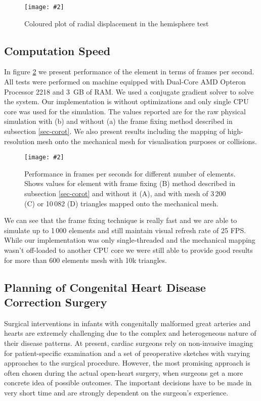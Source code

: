 \documentclass{egpubl}
\newcommand{\Figure}[3]{%
\begin{figure}[htb]
  \centering
  \texttt{[image: \#2]}
  \caption{\label{fig-#2}#3}
\end{figure}}
\begin{document}
\Figure{\linewidth}{hemisphere-img}
{Coloured plot of radial displacement in the hemisphere test}


\subsection{Computation Speed}\label{sec-fps} %

In figure \ref{fig-fps} we present performance of the element in terms of
frames per second. All tests were performed on machine equipped with Dual-Core
AMD Opteron Processor 2218 and 3~GB of RAM. We used a conjugate gradient solver
to solve the system. Our implementation is without optimizations
and only single CPU core was used for the
simulation. The values reported are for the raw physical simulation with (b)
and without (a) the frame fixing method described in subsection
\ref{sec-corot}. We also present results including the mapping of
high-resolution mesh onto the mechanical mesh for visualisation purposes or
collisions.

\Figure{\linewidth}{fps}
{Performance in frames per seconds for different number of elements. Shows
values for element with frame fixing (B) method described in subsection
\ref{sec-corot} and without it (A), and with mesh of 3\,200
(C) or 10\,082 (D) triangles mapped onto the mechanical mesh.}

We can see that the frame fixing technique is really fast and we are able
to simulate up to 1\,000 elements and still maintain visual refresh rate of
25 FPS. While our implementation was only single-threaded and the mechanical mapping
wasn't off-loaded to another CPU core we were still able to provide good
results for more than 600 elements mesh with 10k triangles.



\subsection{Planning of Congenital Heart Disease Correction Surgery} %

Surgical interventions in infants with congenitally malformed great arteries
and hearts are extremely challenging due to the complex and heterogeneous
nature of their disease patterns. At present, cardiac surgeons rely on
non-invasive imaging for patient-specific examination and a set of preoperative
sketches with varying approaches to the surgical procedure. However, the most
promising approach is often chosen during the actual open-heart surgery, when
surgeons get a more concrete idea of possible outcomes.
The important decisions have to be made in very
short time and are strongly dependent on the surgeon's experience.
\end{document}
